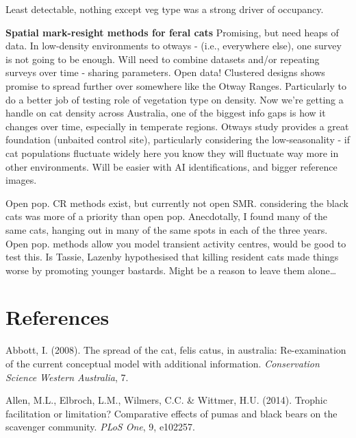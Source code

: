 \documentclass[11pt,a4paper,titlepage,twoside,openright]{style/unimelbthesis}
\begin{document}
\begin{mainmatter}
Least detectable, nothing except veg type was a strong driver of occupancy.

\textbf{Spatial mark-resight methods for feral cats}
Promising, but need heaps of data.
In low-density environments to otways - (i.e., everywhere else), one survey is not going to be enough. Will need to combine datasets and/or repeating surveys over time - sharing parameters. Open data!
Clustered designs shows promise to spread further over somewhere like the Otway Ranges. Particularly to do a better job of testing role of vegetation type on density.
Now we're getting a handle on cat density across Australia, one of the biggest info gaps is how it changes over time, especially in temperate regions. Otways study provides a great foundation (unbaited control site), particularly considering the low-seasonality - if cat populations fluctuate widely here you know they will fluctuate way more in other environments. Will be easier with AI identifications, and bigger reference images.

Open pop. CR methods exist, but currently not open SMR. considering the black cats was more of a priority than open pop. Anecdotally, I found many of the same cats, hanging out in many of the same spots in each of the three years. Open pop. methods allow you model transient activity centres, would be good to test this.
Is Tassie, Lazenby hypothesised that killing resident cats made things worse by promoting younger bastards. Might be a reason to leave them alone\ldots{}

\hypertarget{references}{%
\chapter*{References}\label{references}}


\noindent

\setlength{\parindent}{-0.20in}
\setlength{\leftskip}{0.20in}

\hypertarget{refs}{}
\leavevmode\hypertarget{ref-abbott2008spread}{}%
Abbott, I. (2008). The spread of the cat, felis catus, in australia: Re-examination of the current conceptual model with additional information. \emph{Conservation Science Western Australia}, 7.

\leavevmode\hypertarget{ref-allen2014trophic}{}%
Allen, M.L., Elbroch, L.M., Wilmers, C.C. \& Wittmer, H.U. (2014). Trophic facilitation or limitation? Comparative effects of pumas and black bears on the scavenger community. \emph{PLoS One}, 9, e102257.


\end{mainmatter}
\end{document}
